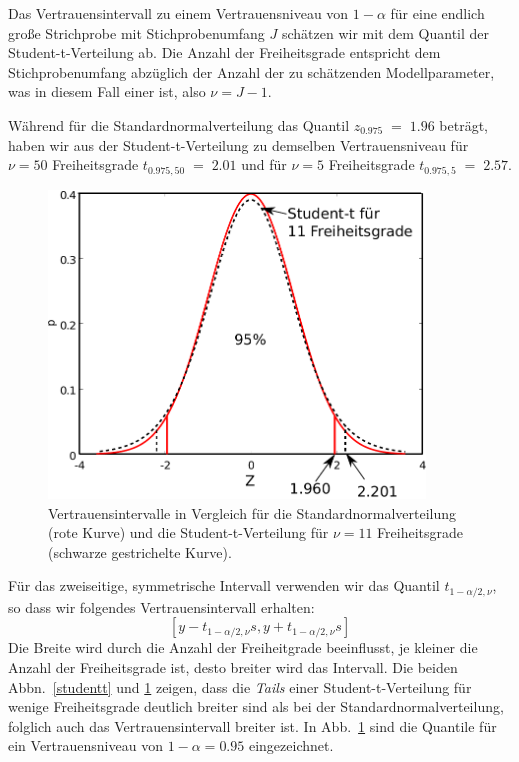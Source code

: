 
Das Vertrauensintervall zu einem Vertrauensniveau von $1 - \alpha$ für eine endlich große
Strichprobe mit Stichprobenumfang $J$ schätzen wir mit dem Quantil der Student-t-Verteilung ab.
Die Anzahl der Freiheitsgrade entspricht dem Stichprobenumfang abzüglich der Anzahl der zu
schätzenden Modellparameter, was in diesem Fall einer ist, also $\nu = J - 1$.




Während für die Standardnormalverteilung das Quantil $z_{0.975} \; = \; 1.96$ beträgt, haben
wir aus der Student-t-Verteilung zu demselben Vertrauensniveau für $\nu = 50$ Freiheitsgrade
$t_{0.975, 50} \; = \; 2.01$ und für $\nu = 5$ Freiheitsgrade $t_{0.975, 5} \; = \; 2.57$.

\begin{figure}
\begin{center}
\includegraphics[width=100mm]{05_vorlesung/media/vertrauensintervall_nu_11.pdf}
\caption{\label{Vertrauensintervalle} Vertrauensintervalle in Vergleich für die 
Standardnormalverteilung (rote Kurve)
und die Student-t-Verteilung für $\nu = 11$ Freiheitsgrade (schwarze gestrichelte Kurve).}
\end{center}
\end{figure}
Für das zweiseitige, symmetrische Intervall verwenden wir das Quantil $t_{1-\alpha/2,\nu}$, so dass
wir folgendes Vertrauensintervall erhalten:
$$
[y - t_{1-\alpha/2,\nu} s, y + t_{1-\alpha/2,\nu} s]
$$
Die Breite wird durch die Anzahl der Freiheitgrade beeinflusst, je kleiner
die Anzahl der Freiheitsgrade ist, desto breiter wird das Intervall. Die beiden Abbn.~\ref{studentt}
und \ref{Vertrauensintervalle}
zeigen, dass die \textsl{Tails} einer Student-t-Verteilung für wenige Freiheitsgrade
deutlich breiter sind als bei der Standardnormalverteilung, folglich auch das
Vertrauensintervall breiter ist. In Abb.~\ref{Vertrauensintervalle} sind die Quantile für
ein Vertrauensniveau von $1 - \alpha = 0.95$ eingezeichnet.

